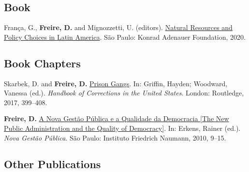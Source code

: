 \documentclass[a4paper]{article}
\renewenvironment{itemize}{
	\begin{list}{}{
			\setlength{\leftmargin}{1.5em}
		}
		}{
	\end{list}
}
\begin{document}
\subsection*{Book}

\begin{itemize}
\item França, G., \textbf{Freire, D.} and Mignozzetti, U. (editors). \href{https://github.com/danilofreire/danilofreire.github.io/blob/master/natural_resources_policy_choices_latam.pdf}{Natural Resources and Policy Choices in Latin America}. São Paulo: Konrad Adenauer Foundation, 2020.
\end{itemize}

\subsection*{Book Chapters}

\begin{itemize}
\item Skarbek, D. and \textbf{Freire, D.} \href{https://osf.io/kuqqx/}{Prison Gangs}. In: Griffin, Hayden; Woodward, Vanessa (ed.). \textit{Handbook of Corrections in the United States}. London: Routledge, 2017, 399--408.
\item \textbf{Freire, D.} \href{https://fnst.org/sites/default/files/uploads/2017/12/08/ngp.pdf}{A Nova Gest\~{a}o P\'{u}blica e a Qualidade da Democracia {[}The New Public Administration and the Quality of Democracy{]}}. In: Erkens, Rainer (ed.). \textit{Nova Gest\~{a}o P\'{u}blica}. S\~{a}o Paulo: Instituto Friedrich Naumann, 2010, 9--15.
\end{itemize}

\subsection*{Other Publications}
\end{document}
